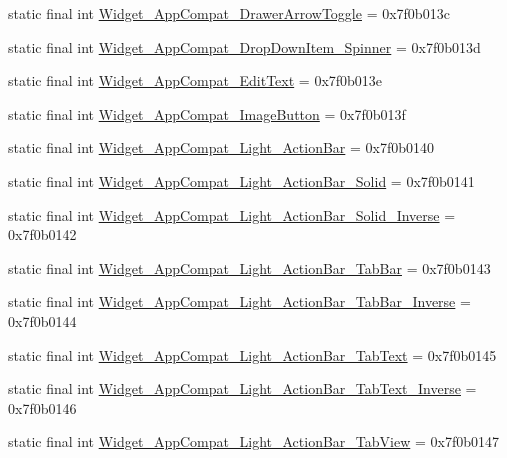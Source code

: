 \begin{CompactItemize}
static final int \hyperlink{classandroid_1_1support_1_1v4_1_1_r_1_1style_de9f9259fa0ad2b2bafecd53f7595d15}{Widget\_\-AppCompat\_\-DrawerArrowToggle} = 0x7f0b013c
\item 
static final int \hyperlink{classandroid_1_1support_1_1v4_1_1_r_1_1style_fc06ff9ba42d6212923a9a75ca0cd395}{Widget\_\-AppCompat\_\-DropDownItem\_\-Spinner} = 0x7f0b013d
\item 
static final int \hyperlink{classandroid_1_1support_1_1v4_1_1_r_1_1style_41373448b2f6514b0f6390985f1b2a62}{Widget\_\-AppCompat\_\-EditText} = 0x7f0b013e
\item 
static final int \hyperlink{classandroid_1_1support_1_1v4_1_1_r_1_1style_9ab3078f2bfb0007b9e8e4745cfff8d7}{Widget\_\-AppCompat\_\-ImageButton} = 0x7f0b013f
\item 
static final int \hyperlink{classandroid_1_1support_1_1v4_1_1_r_1_1style_bfdf81a58f8d9ecd11a2ca88c4272186}{Widget\_\-AppCompat\_\-Light\_\-ActionBar} = 0x7f0b0140
\item 
static final int \hyperlink{classandroid_1_1support_1_1v4_1_1_r_1_1style_91ed1caf401816df7fb54f40388e39bc}{Widget\_\-AppCompat\_\-Light\_\-ActionBar\_\-Solid} = 0x7f0b0141
\item 
static final int \hyperlink{classandroid_1_1support_1_1v4_1_1_r_1_1style_706f08594aac8e8c0678ec77e9f379be}{Widget\_\-AppCompat\_\-Light\_\-ActionBar\_\-Solid\_\-Inverse} = 0x7f0b0142
\item 
static final int \hyperlink{classandroid_1_1support_1_1v4_1_1_r_1_1style_af97efa888f78b0b488301178753e4ee}{Widget\_\-AppCompat\_\-Light\_\-ActionBar\_\-TabBar} = 0x7f0b0143
\item 
static final int \hyperlink{classandroid_1_1support_1_1v4_1_1_r_1_1style_611a1ef49f4b07945b3fb556e5f0d705}{Widget\_\-AppCompat\_\-Light\_\-ActionBar\_\-TabBar\_\-Inverse} = 0x7f0b0144
\item 
static final int \hyperlink{classandroid_1_1support_1_1v4_1_1_r_1_1style_c6044728c446e1a8e7f83c1de5bcf7bd}{Widget\_\-AppCompat\_\-Light\_\-ActionBar\_\-TabText} = 0x7f0b0145
\item 
static final int \hyperlink{classandroid_1_1support_1_1v4_1_1_r_1_1style_32a05793de8f8610fa8bd38e92bfe916}{Widget\_\-AppCompat\_\-Light\_\-ActionBar\_\-TabText\_\-Inverse} = 0x7f0b0146
\item 
static final int \hyperlink{classandroid_1_1support_1_1v4_1_1_r_1_1style_41a39602d92588b7b4c2926d59db660c}{Widget\_\-AppCompat\_\-Light\_\-ActionBar\_\-TabView} = 0x7f0b0147
\item 

\end{CompactItemize}
